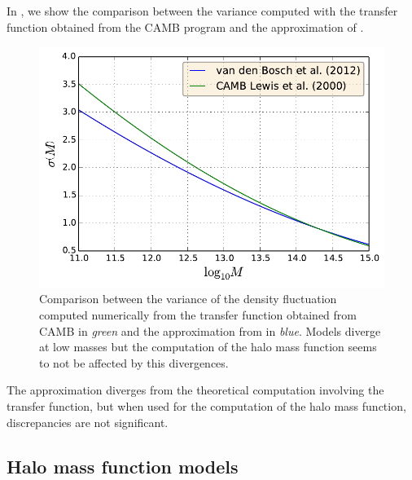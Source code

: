 In , we show the comparison between the variance
computed with the transfer function obtained from the CAMB program and the
approximation of \citet{vandenBosch+02}.
%
\begin{figure}[htb]
    \centering
    \includegraphics[width=0.6\linewidth]{figures/hmf/sigma.pdf}
    \caption{Comparison between the variance of the density fluctuation
        computed numerically from the transfer function obtained from CAMB
        \citep{Lewis+00} in \emph{green} and the approximation from
        \citet{vandenBosch+02} in \emph{blue}. Models diverge at low masses
        but the computation of the halo mass function seems to not be
    affected by this divergences.\label{fig:sigma}}
\end{figure}
%
The approximation diverges from the theoretical computation involving the
transfer function, but when used for the computation of the halo mass
function, discrepancies are not significant.

\subsection{Halo mass function models}
\label{sub:halo_mass_function_models}

